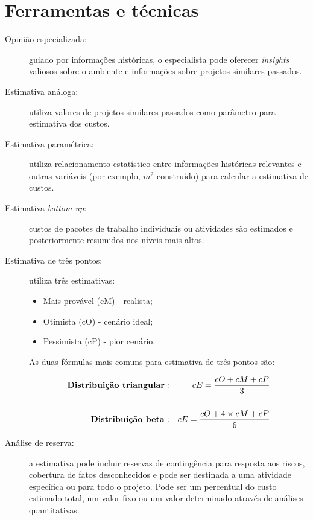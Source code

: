 \section{Ferramentas e técnicas}

\begin{description}
	
	\item[Opinião especializada:] guiado por informações históricas, o especialista pode oferecer \textit{insights} valiosos sobre o ambiente e informações sobre projetos similares passados.
	
	\item[Estimativa análoga:] utiliza valores de projetos similares passados como parâmetro para estimativa dos custos.
	
	\item[Estimativa paramétrica:] utiliza relacionamento estatístico entre informações históricas relevantes e outras variáveis (por exemplo, $m^2$ construído) para calcular a estimativa de custos.
	
	\item[Estimativa \textit{bottom-up}:] custos de pacotes de trabalho individuais ou atividades são estimados e posteriormente resumidos nos níveis mais altos.
	
	\item[Estimativa de três pontos:] utiliza três estimativas:
	
		\begin{itemize}
			\item Mais provável (cM) - realista;
			\item Otimista (cO) - cenário ideal;
			\item Pessimista (cP) - pior cenário.		
		\end{itemize}
		
	As duas fórmulas mais comuns para estimativa de três pontos são:
	
		\begin{eqnarray*}
			\text{\textbf{Distribuição triangular}}&:&cE=\frac{cO+cM+cP}{3}\\	
			&&\\	
			\text{\textbf{Distribuição beta}}&:&cE=\frac{cO+4 \times cM+cP}{6}
		\end{eqnarray*}
		
	\item[Análise de reserva:] a estimativa pode incluir reservas de contingência para resposta aos riscos, cobertura de fatos desconhecidos e pode ser destinada a uma atividade específica ou para todo o projeto. Pode ser um percentual do custo estimado total, um valor fixo ou um valor determinado através de análises quantitativas.
	

\end{description}
